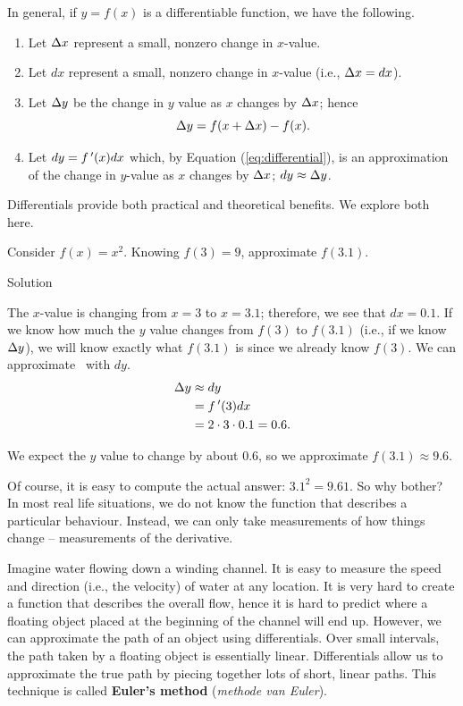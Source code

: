 In general, if $y = f(x)$ is a differentiable function, we have the following. 
\begin{enumerate}
	\item Let $\Delta x$ represent a small, nonzero change in $x$-value.
	\item	Let $dx$ represent a small, nonzero change in $x$-value (i.e., $\Delta x = dx$).
	\item	Let $\Delta y$ be the change in $y$ value as $x$ changes by $\Delta x$; hence $$\Delta y = f(x+\Delta x)-f(x).$$
	\item		Let $dy = f\,'(x)dx$ which, by Equation (\ref{eq:differential}), is an approximation of the change in $y$-value as $x$ changes by $\Delta x$; $dy \approx \Delta y$.
\end{enumerate}

Differentials provide both practical and theoretical benefits. We explore both here.


\begin{example}\label{ex_diffal1}
Consider $f(x) = x^2$. Knowing $f(3) = 9$, approximate $f(3.1)$.

Solution 

The $x$-value is changing from $x=3$ to $x=3.1$; therefore, we see that $dx=0.1$. If we know how much the $y$ value changes from $f(3)$ to $f(3.1)$ (i.e., if we know $\Delta y$), we will know exactly what $f(3.1)$ is since we already know $f(3)$. We can approximate \dy\ with $dy$.
\begin{align*} \Delta y &\approx dy \\
								  &= f\,'(3)dx \\
								  &= 2\cdot 3\cdot 0.1 = 0.6.
\end{align*}

We expect the $y$ value to change by about $0.6$, so we approximate $f(3.1) \approx 9.6.$

\end{example}

Of course, it is easy to compute the actual answer: $3.1^2 = 9.61.$ So why bother? In most real life situations, we do not know the function that describes a particular behaviour. Instead, we can only take measurements of how things change -- measurements of the derivative.

Imagine water flowing down a winding channel. It is easy to measure the speed and direction (i.e., the velocity) of water at any location. It is very hard to create a function that describes the overall flow, hence it is hard to predict where a floating object placed at the beginning of the channel will end up. However, we can approximate the path of an object using differentials. Over small intervals, the path taken by a floating object is essentially linear. Differentials allow us to approximate the true path by piecing together lots of short, linear paths. This technique is called \textbf{Euler's method} (\textit{methode van Euler}).

